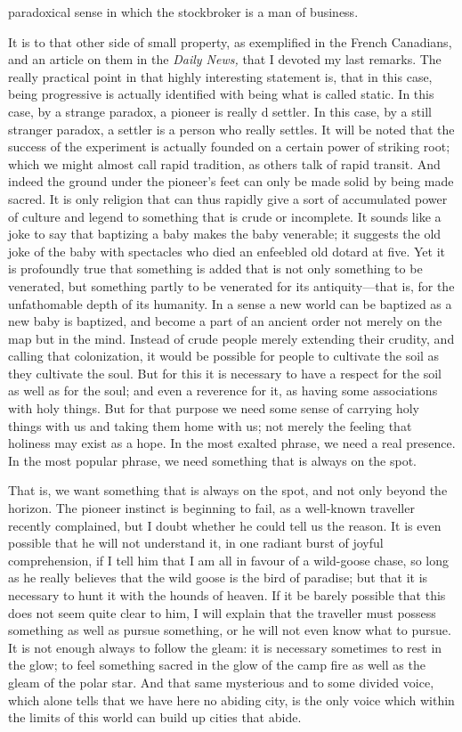 \documentclass{book}
\begin{document}
paradoxical sense in which the stockbroker is a man of business.

It is to that other side of small property, as exemplified in the French Canadians, and an article on them in the \emph{Daily News,} that I devoted my last remarks. The really practical point in that highly interesting statement is, that in this case, being progressive is actually identified with being what is called static. In this case, by a strange paradox, a pioneer is really d settler. In this case, by a still stranger paradox, a settler is a person who really settles. It will be noted that the success of the experiment is actually founded on a certain power of striking root; which we might almost call rapid tradition, as others talk of rapid transit. And indeed the ground under the pioneer’s feet can only be made solid by being made sacred. It is only religion that can thus rapidly give a sort of accumulated power of culture and legend to something that is crude or incomplete. It sounds like a joke to say that baptizing a baby makes the baby venerable; it suggests the old joke of the baby with spectacles who died an enfeebled old dotard at five. Yet it is profoundly true that something is added that is not only something to be venerated, but something partly to be venerated for its antiquity—that is, for the unfathomable depth of its humanity. In a sense a new world can be baptized as a new baby is baptized, and become a part of an ancient order not merely on the map but in the mind. Instead of crude people merely extending their crudity, and calling that colonization, it would be possible for people to cultivate the soil as they cultivate the soul. But for this it is necessary to have a respect for the soil as well as for the soul; and even a reverence for it, as having some associations with holy things. But for that purpose we need some sense of carrying holy things with us and taking them home with us; not merely the feeling that holiness may exist as a hope. In the most exalted phrase, we need a real presence. In the most popular phrase, we need something that is always on the spot.

That is, we want something that is always on the spot, and not only beyond the horizon. The pioneer instinct is beginning to fail, as a well-known traveller recently complained, but I doubt whether he could tell us the reason. It is even possible that he will not understand it, in one radiant burst of joyful comprehension, if I tell him that I am all in favour of a wild-goose chase, so long as he really believes that the wild goose is the bird of paradise; but that it is necessary to hunt it with the hounds of heaven. If it be barely possible that this does not seem quite clear to him, I will explain that the traveller must possess something as well as pursue something, or he will not even know what to pursue. It is not enough always to follow the gleam: it is necessary sometimes to rest in the glow; to feel something sacred in the glow of the camp fire as well as the gleam of the polar star. And that same mysterious and to some divided voice, which alone tells that we have here no abiding city, is the only voice which within the limits of this world can build up cities that abide.
\end{document}
